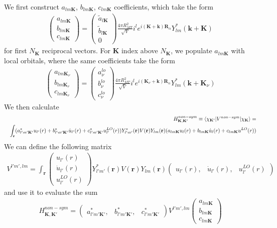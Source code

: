 \documentclass[aps,prb,floatfix,epsfig,singlecolumn,showpacs,preprintnumbers]{revtex4}
\newcommand{\vR}{{\mathbf{R}}}
\renewcommand{\vr}{{\mathbf{r}}}
\newcommand{\vk}{{\mathbf{k}}}
\newcommand{\vK}{{\mathbf{K}}}
\begin{document}
We first construct $a_{lm\vK}$, $b_{lm\vK}$, $c_{lm\vK}$
coefficients, which take the form
\begin{eqnarray}
\left(\begin{array}{c}
a_{lm\vK}\\
b_{lm\vK}\\
c_{lm\vK}
\end{array}\right)=
\left(\begin{array}{c}
\tilde{a}_{l\vK}\\
\tilde{b}_{l\vK}\\
0
\end{array}\right)
\frac{4\pi R_{MT}^2}{\sqrt{V}} i^l e^{i(\vK+\vk)\vR_\alpha}  Y_{lm}^*(\vk+\vK)
\end{eqnarray}
for first $N_\vK$ reciprocal vectors. For $\vK$ index above $N_\vK$, we
populate $a_{lm\vK}$ with local orbitals, where the same coefficients take the form
\begin{eqnarray}
\left(\begin{array}{c}
a_{lm\vK_\nu}\\
b_{lm\vK_\nu}\\
c_{lm\vK_\nu}
\end{array}\right)=
\left(\begin{array}{c}
a^{lo}_\nu\\
b^{lo}_\nu\\
c^{lo}_\nu
\end{array}\right)
\frac{4\pi R_{MT}^2}{\sqrt{V}} i^l e^{i(\vK_\nu+\vk)\vR_\alpha}  Y_{lm}^*(\vk+\vK_\nu)
\end{eqnarray}
We then calculate
\begin{eqnarray}
&& H^{non-sym}_{\vK,\vK'} \equiv \braket{\chi_{\vK'}| V^{non-sym}|\chi_\vK}=\\
&& \int_{\vr} (a^*_{l'm'\vK'} u_{l'}(r) +
   b^*_{l'm'\vK'}\dot{u}_{l'}(r) +
   c^*_{l'm'\vK'}u^{LO}_{l'}(r))Y^*_{l'm'}(\vr)V(\vr)
   Y_{lm}(\vr)(a_{lm\vK} u_l(r) + b_{lm\vK}\dot{u}_l(r) +
   c_{lm\vK}u^{LO}(r))
\nonumber
\end{eqnarray}
We can define the following matrix
\begin{eqnarray}
V^{l'm',lm}=\int_\vr 
\left(
\begin{array}{c}
u_{l'}(r) \\
\dot{u}_{l'}(r)\\
u^{LO}_{l'}(r)
\end{array}
\right)
Y_{l'm'}^*(\vr) V(\vr) 
Y_{lm}(\vr)
\left(
\begin{array}{ccc}
u_{l'}(r), &\dot{u}_{l'}(r), &u^{LO}_{l'}(r)
\end{array}
\right)
\end{eqnarray}
and use it to evaluate the sum
\begin{eqnarray}
H^{non-sym}_{\vK,\vK'} =
\left(
\begin{array}{ccc}
a^*_{l'm'\vK'},&  b^*_{l'm'\vK'},& c^*_{l'm'\vK'}
\end{array}
\right)
V^{l'm',lm}
\left(
\begin{array}{c}
a_{lm\vK}\\
b_{lm\vK}\\
c_{lm\vK}
\end{array}
\right)
\nonumber
\end{eqnarray}
\end{document}
